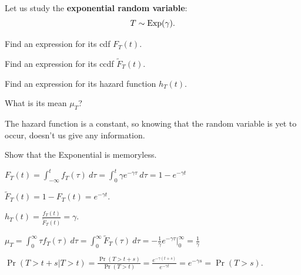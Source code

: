 \begin{slide}
\question \label{exponential}


Let us study the \textbf{exponential random variable}: 
\[T \sim {\rm Exp}(\gamma).\]

\begin{parts}
	\item Find an expression for its cdf $F_T(t)$.
	\item Find an expression for its ccdf $\tilde{F}_T(t)$.
	\item Find an expression for its hazard function $h_T(t)$.
	\item What is its mean $\mu_T$?
\end{parts}

\begin{slidesonly}
\vspace{3cm}	
\end{slidesonly}

The hazard function is a constant, so knowing that the random variable is yet to occur, doesn't us give any information.



\begin{parts}
\setcounter{partsitem}{4}
	\item Show that the Exponential is memoryless.
\end{parts}
	
\end{slide}


\begin{solution}
\begin{slide}
\begin{parts}

	\item $\displaystyle F_T(t) 
	 		= \int_{-\infty}^t f_T(\tau)~d\tau
	 		= \int_0^t \gamma e^{-\gamma \tau} ~d\tau
	 		= 1-e^{-\gamma t}$
	 
	 \item $\tilde{F}_T(t) = 1 - F_T(t) = e^{-\gamma t}$.

	 \item $\displaystyle h_T(t) = \frac{f_T(t)}{\tilde{F}_T(t)} = \gamma$.

	 \item $\displaystyle \mu_T 
	 		= \int_{0}^\infty \tau f_T(\tau) ~d\tau
	 		= \int_0^\infty \tilde{F}_T(\tau) ~d\tau 
	 		= -\frac{1}{\gamma} e^{-\gamma \tau} \big|_0^\infty
	 		= \frac{1}{\gamma}$
	 	
	 \item 
	 $\displaystyle \Pr(T>t+s|T>t) = \frac{\Pr(T>t+s)}{\Pr(T>t)} = \frac{e^{-\gamma (t+s)}}{e^{-\gamma t}} = e^{-\gamma s} = \Pr(T>s)$.
	 
	

	
\end{parts}


	
\end{slide}

\end{solution}
	




